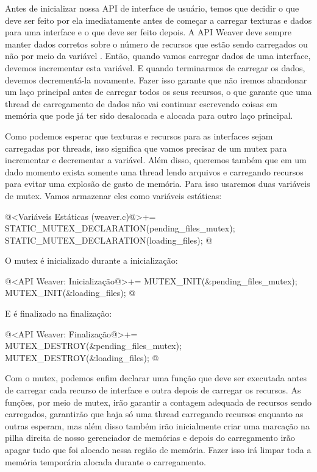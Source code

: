 Antes de inicializar nossa API de interface de usuário, temos que
decidir o que deve ser feito por ela imediatamente antes de começar a
carregar texturas e dados para uma interface e o que deve ser feito
depois. A API Weaver deve sempre manter dados corretos sobre o número
de recursos que estão sendo carregados ou não por meio da
variável . Então, quando vamos carregar
dados de uma interface, devemos incrementar esta variável. E quando
terminarmos de carregar os dados, devemos decrementá-la
novamente. Fazer isso garante que não iremos abandonar um laço
principal antes de carregar todos os seus recursos, o que garante que
uma thread de carregamento de dados não vai continuar escrevendo
coisas em memória que pode já ter sido desalocada e alocada para outro
laço principal.

Como podemos esperar que texturas e recursos para as interfaces sejam
carregadas por threads, isso significa que vamos precisar de um mutex
para incrementar e decrementar a variável. Além disso, queremos também
que em um dado momento exista somente uma thread lendo arquivos e
carregando recursos para evitar uma explosão de gasto de memória. Para
isso usaremos duas variáveis de mutex. Vamos armazenar eles como
variáveis estáticas:

\iniciocodigo
@<Variáveis Estáticas (weaver.c)@>+=
STATIC_MUTEX_DECLARATION(pending_files_mutex);
STATIC_MUTEX_DECLARATION(loading_files);
@
\fimcodigo

O mutex é inicializado durante a inicialização:

\iniciocodigo
@<API Weaver: Inicialização@>+=
MUTEX_INIT(&pending_files_mutex);
MUTEX_INIT(&loading_files);
@
\fimdodigo

E é finalizado na finalização:

\iniciocodigo
@<API Weaver: Finalização@>+=
MUTEX_DESTROY(&pending_files_mutex);
MUTEX_DESTROY(&loading_files);
@
\fimcodigo

Com o mutex, podemos enfim declarar uma função que deve ser executada
antes de carregar cada recurso de interface e outra depois de carregar
os recursos. As funções, por meio de mutex, irão garantir a contagem
adequada de recursos sendo carregados, garantirão que haja só uma
thread carregando recursos enquanto as outras esperam, mas além disso
também irão inicialmente criar uma marcação na pilha direita de nosso
gerenciador de memórias e depois do carregamento irão apagar tudo que
foi alocado nessa região de memória. Fazer isso irá limpar toda a
memória temporária alocada durante o carregamento.

